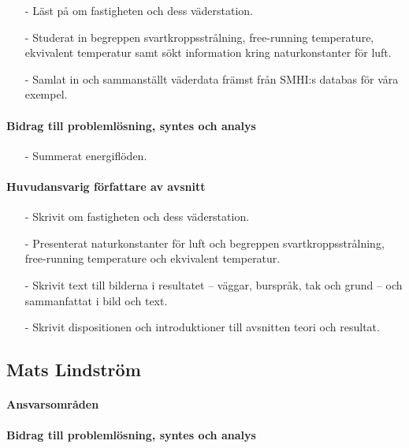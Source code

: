 \documentclass[12pt,a4paper]{article}
\begin{document}
\begin{itemize}
\item[-] Läst på om fastigheten och dess väderstation.
\item[-] Studerat in begreppen svartkroppsstrålning, free-running temperature, ekvivalent temperatur samt sökt information kring naturkonstanter för luft.
\item[-] Samlat in och sammanställt väderdata främst från SMHI:s databas för våra exempel.
\end{itemize}

\paragraph{Bidrag till problemlösning, syntes och analys}
\begin{itemize}
\item[-] Summerat energiflöden.
\end{itemize}

\paragraph{Huvudansvarig författare av avsnitt}

\begin{itemize}
\item[-] Skrivit om fastigheten och dess väderstation.
\item[-] Presenterat naturkonstanter för luft och begreppen svartkroppsstrålning, free-running temperature och ekvivalent temperatur.
\item[-] Skrivit text till bilderna i resultatet – väggar, burspråk, tak och grund – och sammanfattat i bild och text.
\item[-] Skrivit dispositionen och introduktioner till avsnitten teori och resultat.
\end{itemize}


\subsection*{Mats Lindström}

\paragraph{Ansvarsområden}

\paragraph{Bidrag till problemlösning, syntes och analys}
\end{document}
